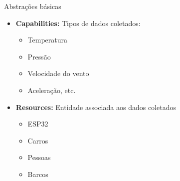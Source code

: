\documentclass[aspectratio=169,xcolor=dvipsnames]{beamer}
\begin{document}
\begin{frame}{Abstrações básicas}
\begin{itemize}
    \item \textbf{Capabilities:} Tipos de dados coletados:
    \begin{itemize}
        \item Temperatura
        \item Pressão
        \item Velocidade do vento 
        \item Aceleração, etc.
    \end{itemize}
    \item \textbf{Resources:} Entidade associada aos dados coletados
    \begin{itemize}
        \item ESP32
        \item Carros
        \item Pessoas
        \item Barcos
    \end{itemize}
\end{itemize}
\end{frame}
\end{document}
